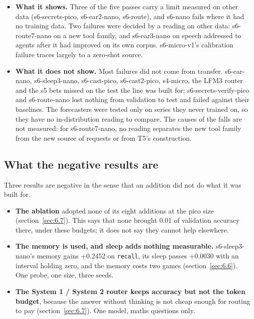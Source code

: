 \documentclass[10pt]{article}
\begin{document}
\begin{itemize}
\item \textbf{What it shows.} Three of the five passes carry a limit measured on other data (s6-secrets-pico, s6-ear2-nano, s6-route), and s6-nano fails where it had no training data. Two failures were decided by a reading on other data: s6-route7-nano on a new tool family, and s6-ear3-nano on speech addressed to agents after it had improved on its own corpus. s6-micro-v1's calibration failure traces largely to a zero-shot source.
\item \textbf{What it does not show.} Most failures did not come from transfer. s6-ear-nano, s6-sleep3-nano, s6-cast-pico, s6-cast2-pico, s4-micro, the LFM3 router and the s5 bets missed on the test the line was built for; s6-secrets-verify-pico and s6-route-nano lost nothing from validation to test and failed against their baselines. The forecasters were tested only on series they never trained on, so they have no in-distribution reading to compare. The causes of the falls are not measured: for s6-route7-nano, no reading separates the new tool family from the new source of requests or from T5's construction.
\end{itemize}

\subsection{What the negative results are}\label{sec:5.5}

Three results are negative in the sense that an addition did not do what it was built for.

\begin{itemize}
\item \textbf{The ablation} adopted none of its eight additions at the pico size (section~\ref{sec:6.7}). This says that none brought 0.01 of validation accuracy there, under these budgets; it does not say they cannot help elsewhere.
\item \textbf{The memory is used, and sleep adds nothing measurable.} s6-sleep3-nano's memory gains +0.2452 on \texttt{recall}, its sleep passes +0.0030 with an interval holding zero, and the memory costs two games (section~\ref{sec:6.6}). One probe, one size, three seeds.
\item \textbf{The System 1 / System 2 router keeps accuracy but not the token budget}, because the answer without thinking is not cheap enough for routing to pay (section~\ref{sec:6.7}). One model, maths questions only.
\end{itemize}
\end{document}
